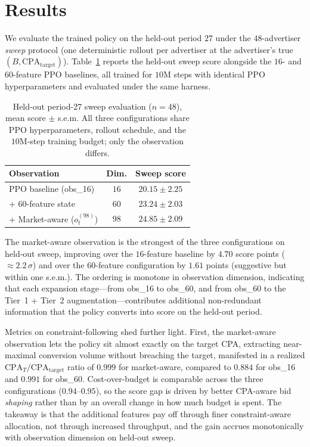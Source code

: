 \documentclass[11pt]{article}
\begin{document}
\section{Results}

We evaluate the trained policy on the held-out period $27$ under the
$48$-advertiser \emph{sweep} protocol (one deterministic rollout per
advertiser at the advertiser's true $(B,\mathrm{CPA}_{\mathrm{target}})$).
Table~\ref{tab:market-aware-eval} reports the held-out sweep score
alongside the $16$- and $60$-feature PPO baselines, all trained for
$10\mathrm{M}$ steps with identical PPO hyperparameters and evaluated under
the same harness.

\begin{table}[h]
  \centering
  \small
  \caption{Held-out period-27 sweep evaluation ($n{=}48$), mean score
  $\pm$ s.e.m. All three configurations share PPO hyperparameters,
  rollout schedule, and the $10\mathrm{M}$-step training budget; only
  the observation differs.}
  \label{tab:market-aware-eval}
  \begin{tabular}{@{}lcc@{}}
    \toprule
    Observation & Dim. & Sweep score \\
    \midrule
    PPO baseline (obs\_16)         & $16$ & $20.15 \pm 2.25$ \\
    + $60$-feature state           & $60$ & $23.24 \pm 2.03$ \\
    + Market-aware ($o_t^{(98)}$)  & $98$ & $\mathbf{24.85 \pm 2.09}$ \\
    \bottomrule
  \end{tabular}
\end{table}

The market-aware observation is the strongest of the three configurations
on held-out sweep, improving over the $16$-feature baseline by
$4.70$ score points ($\approx\!2.2\,\sigma$) and over the $60$-feature
configuration by $1.61$ points (suggestive but within one s.e.m.). The
ordering is monotone in observation dimension, indicating that each
expansion stage---from obs\_16 to obs\_60, and from obs\_60 to the Tier~1
+ Tier~2 augmentation---contributes additional non-redundant information
that the policy converts into score on the held-out period.

Metrics on constraint-following shed further light. First, the
market-aware observation lets the policy sit almost exactly on the target
CPA, extracting near-maximal conversion volume without breaching the
target, manifested in a realized
$\mathrm{CPA}_T/\mathrm{CPA}_{\mathrm{target}}$ ratio of $0.999$ for
market-aware, compared to $0.884$ for obs\_16 and $0.991$ for obs\_60.
Cost-over-budget is comparable across the three configurations
($0.94$--$0.95$), so the score gap is driven by better CPA-aware bid
\emph{shaping} rather than by an overall change in how much budget is
spent. The takeaway is that the additional features pay off through
finer constraint-aware allocation, not through increased throughput,
and the gain accrues monotonically with observation dimension on
held-out sweep.
\end{document}
